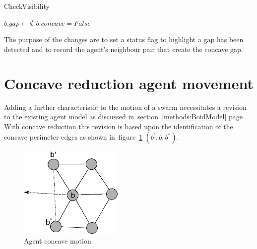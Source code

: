 \begin{algorithm}[H]
\DontPrintSemicolon
\SetAlgoLined
\caption{CheckVisibility}
$b.gap \leftarrow \emptyset$\;
$b.concave = False$\;
\label{algo:checkVisibility2}
\end{algorithm}

The purpose of the changes are to set a status flag to highlight a gap has been detected and to record the agent's neighbour pair that create the concave gap.

\section{Concave reduction agent movement}\label{concave:AgentMovement}
Adding a further characteristic to the motion of a swarm necessitates a revision to the existing agent model as discussed in~section~\ref{methods:BoidModel} page \pageref{methods:BoidModel}. With concave reduction this revision is based upon the identification of the concave perimeter edges as shown in~figure~\ref{concave:VoidConcave1} $(b^{'},b,b^{''})$. 

\begin{figure}[H]
\begin{center}
\includegraphics[width=5cm]{CHAPTER-7/figures/VoidConcave1}
\end{center}
\caption{Agent concave motion\label{concave:VoidConcave1}}
\end{figure}

